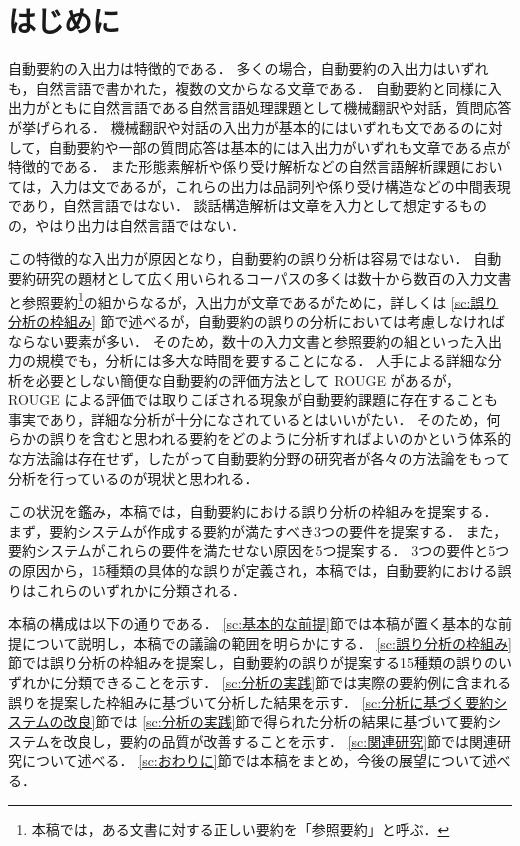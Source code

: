 \maketitle

\section{はじめに}

自動要約の入出力は特徴的である．
多くの場合，自動要約の入出力はいずれも，自然言語で書かれた，複数の文からなる文章である．
自動要約と同様に入出力がともに自然言語である自然言語処理課題として機械翻訳や対話，質問応答が挙げられる．
機械翻訳や対話の入出力が基本的にはいずれも文であるのに対して，自動要約や一部の質問応答は基本的には入出力がいずれも文章である点が特徴的である．
また形態素解析や係り受け解析などの自然言語解析課題においては，入力は文であるが，これらの出力は品詞列や係り受け構造などの中間表現であり，自然言語ではない．
談話構造解析は文章を入力として想定するものの，やはり出力は自然言語ではない．

この特徴的な入出力が原因となり，自動要約の誤り分析は容易ではない．
自動要約研究の題材として広く用いられるコーパスの多くは数十から数百の入力文書と参照要約\footnote{本稿では，ある文書に対する正しい要約を「参照要約」と呼ぶ．}の組からなるが，入出力が文章であるがために，詳しくは \ref{sc:誤り分析の枠組み} 節で述べるが，自動要約の誤りの分析においては考慮しなければならない要素が多い．
そのため，数十の入力文書と参照要約の組といった入出力の規模でも，分析には多大な時間を要することになる．
人手による詳細な分析を必要としない簡便な自動要約の評価方法として ROUGE \cite{lin04} があるが， ROUGE による評価では取りこぼされる現象が自動要約課題に存在することも事実であり，詳細な分析が十分になされているとはいいがたい．
そのため，何らかの誤りを含むと思われる要約をどのように分析すればよいのかという体系的な方法論は存在せず，したがって自動要約分野の研究者が各々の方法論をもって分析を行っているのが現状と思われる．

この状況を鑑み，本稿では，自動要約における誤り分析の枠組みを提案する．
まず，要約システムが作成する要約が満たすべき3つの要件を提案する．
また，要約システムがこれらの要件を満たせない原因を5つ提案する．
3つの要件と5つの原因から，15種類の具体的な誤りが定義され，本稿では，自動要約における誤りはこれらのいずれかに分類される．

本稿の構成は以下の通りである．
\ref{sc:基本的な前提}節では本稿が置く基本的な前提について説明し，本稿での議論の範囲を明らかにする．
\ref{sc:誤り分析の枠組み}節では誤り分析の枠組みを提案し，自動要約の誤りが提案する15種類の誤りのいずれかに分類できることを示す．
\ref{sc:分析の実践}節では実際の要約例に含まれる誤りを提案した枠組みに基づいて分析した結果を示す．
\ref{sc:分析に基づく要約システムの改良}節では
\ref{sc:分析の実践}節で得られた分析の結果に基づいて要約システムを改良し，要約の品質が改善することを示す．
\ref{sc:関連研究}節では関連研究について述べる．
\ref{sc:おわりに}節では本稿をまとめ，今後の展望について述べる．


